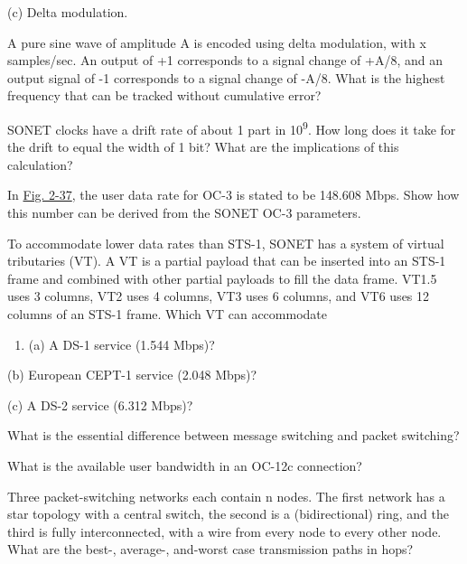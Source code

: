 \documentclass[b5paper,11pt]{memoir}
\begin{document}
(c) Delta modulation.

{}

A pure sine wave of amplitude {A} is encoded using delta modulation,
with {x} samples/sec. An output of +1 corresponds to a signal change of
+{A/}8, and an output signal of -1 corresponds to a signal change of
-{A/}8{.} What is the highest frequency that can be tracked without
cumulative error?

{}

SONET clocks have a drift rate of about 1 part in 10\textsuperscript{9}.
How long does it take for the drift to equal the width of 1 bit? What
are the implications of this calculation?

{}

In
\protect\hyperlink{0130661023_ch02lev1sec5.htmlux5cux23ch02fig37}{Fig.
2-37}, the user data rate for OC-3 is stated to be 148.608 Mbps. Show
how this number can be derived from the SONET OC-3 parameters.

{}

To accommodate lower data rates than STS-1, SONET has a system of
virtual tributaries (VT). A VT is a partial payload that can be inserted
into an STS-1 frame and combined with other partial payloads to fill the
data frame. VT1.5 uses 3 columns, VT2 uses 4 columns, VT3 uses 6
columns, and VT6 uses 12 columns of an STS-1 frame. Which VT can
accommodate

{}

\begin{enumerate}
\def\labelenumi{\alph{enumi}.}
\item
  {}

  (a) A DS-1 service (1.544 Mbps)?
\end{enumerate}

{}

(b) European CEPT-1 service (2.048 Mbps)?

{}

(c) A DS-2 service (6.312 Mbps)?

{}

What is the essential difference between message switching and packet
switching?

{}

What is the available user bandwidth in an OC-12c connection?

{}

Three packet-switching networks each contain {n} nodes. The first
network has a star topology with a central switch, the second is a
(bidirectional) ring, and the third is fully interconnected, with a wire
from every node to every other node. What are the best-, average-,
and-worst case transmission paths in hops?
\end{document}

